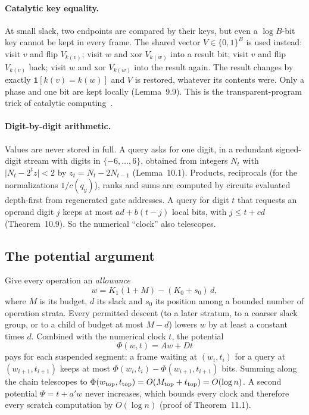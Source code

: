 \documentclass[11pt]{article}
\theoremstyle{definition}
\theoremstyle{remark}
\newcommand{\abs}[1]{\lvert #1\rvert}
\newcommand{\one}{\mathbf 1}
\begin{document}
\paragraph{Catalytic key equality.} At small slack, two endpoints are compared
by their keys, but even a $\log B$-bit key cannot be kept in every frame. The
shared vector $V\in\{0,1\}^B$ is used instead: visit $v$ and flip $V_{k(v)}$; visit
$w$ and xor $V_{k(w)}$ into a result bit; visit $v$ and flip $V_{k(v)}$ back; visit $w$
and xor $V_{k(w)}$ into the result again. The result changes by exactly
$\one[k(v)=k(w)]$ and $V$ is restored, whatever its contents were. Only a phase
and one bit are kept locally (Lemma~9.9). This is the transparent-program trick
of catalytic computing~\cite{BCKLS}.

\paragraph{Digit-by-digit arithmetic.} Values are never stored in full. A query
asks for one digit, in a redundant signed-digit stream with digits in
$\{-6,\dots,6\}$, obtained from integers $N_t$ with $\abs{N_t-2^tz}<2$ by
$z_t=N_t-2N_{t-1}$ (Lemma~10.1). Products, reciprocals (for the normalizations
$1/c(q_y)$), ranks and sums are computed by circuits evaluated depth-first from
regenerated gate addresses. A query for digit $t$ that requests an operand digit
$j$ keeps at most $ad+b(t-j)$ local bits, with $j\le t+cd$ (Theorem~10.9). So the
numerical ``clock'' also telescopes.

\subsection{The potential argument}

Give every operation an \emph{allowance}
\[
w=K_1(1+M)-(K_0+s_0)\,d,
\]
where $M$ is its budget, $d$ its slack and $s_0$ its position among a bounded
number of operation strata. Every permitted descent (to a later stratum, to a
coarser slack group, or to a child of budget at most $M-d$) lowers $w$ by at least
a constant times $d$. Combined with the numerical clock $t$, the potential
\[
\Phi(w,t)=Aw+Dt
\]
pays for each suspended segment: a frame waiting at $(w_i,t_i)$ for a query at
$(w_{i+1},t_{i+1})$ keeps at most $\Phi(w_i,t_i)-\Phi(w_{i+1},t_{i+1})$ bits. Summing
along the chain telescopes to $\Phi(w_{\rm top},t_{\rm top})=O(M_{\rm top}+t_{\rm top})=O(\log n)$.
A second potential $\Psi=t+a'w$ never increases, which bounds every clock and
therefore every scratch computation by $O(\log n)$ (proof of Theorem~11.1).
\end{document}
